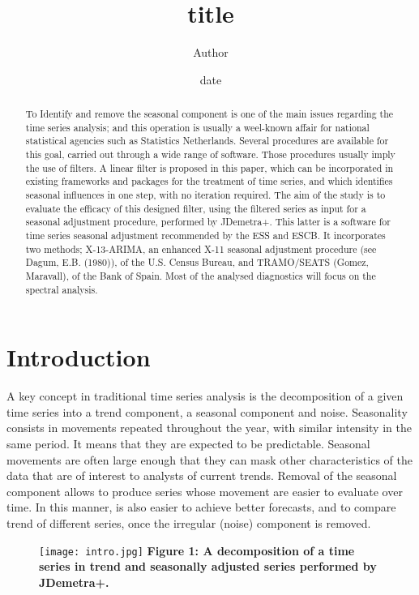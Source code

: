\documentclass{article}
\title{title}
\author{Author}
\date{date}
\begin{document}
\maketitle
\bigskip
\begin{abstract}
To Identify and remove the seasonal component is one of the main issues regarding the time series analysis; and this operation is usually a weel-known affair for national statistical agencies such as Statistics Netherlands. Several procedures are available for this goal, carried out through a wide range of software. Those procedures usually imply the use of filters.  A linear filter is proposed in this paper, which can be incorporated in existing frameworks and packages for the treatment of time series, and which identifies seasonal influences in one step, with no iteration required. The aim of the study is to evaluate the efficacy of this designed filter, using the filtered series as input for a seasonal adjustment procedure, performed by JDemetra+. This latter is a software for time series seasonal adjustment recommended by the ESS and ESCB. It incorporates two methods; X-13-ARIMA, an enhanced X-11 seasonal adjustment procedure (see Dagum, E.B. (1980)), of the U.S. Census Bureau, and TRAMO/SEATS (Gomez, Maravall), of the Bank of Spain. Most of the analysed diagnostics will focus on the spectral analysis.
\end{abstract}
\bigskip
\section{Introduction}
A key concept in traditional time series analysis is the decomposition of a given time series into a trend component, a seasonal component and noise. Seasonality consists in movements repeated throughout the year, with similar intensity in the same period. It means that they are expected to be predictable. Seasonal movements are often large enough that they can mask other characteristics of the data that are of interest to analysts of current trends. Removal of the seasonal component allows to produce series whose movement are easier to evaluate over time. In this manner, is also easier to achieve better forecasts, and to compare trend of different series, once the irregular (noise) component is removed.\\

\begin{figure}[H]
  \texttt{[image: intro.jpg]}
  {\textbf{\scriptsize Figure 1: A decomposition of a time series in trend and seasonally adjusted series performed by JDemetra+.}}
\end{figure}
\end{document}
